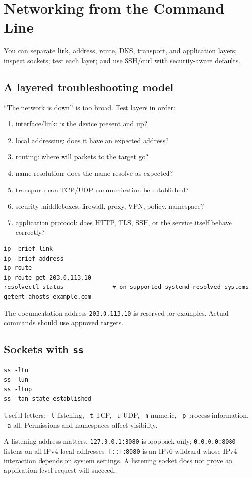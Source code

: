 \documentclass[11pt,oneside,openany]{book}
\newcommand{\chaptergoals}[1]{%
  \begin{tcolorbox}[colback=Paper,colframe=Blue,title={Learning outcomes},fonttitle=\bfseries]
  #1
  \end{tcolorbox}}
\begin{document}
\chapter{Networking from the Command Line}
\chaptergoals{You can separate link, address, route, DNS, transport, and application layers; inspect sockets; test each layer; and use SSH/curl with security-aware defaults.}

\section{A layered troubleshooting model}
“The network is down” is too broad. Test layers in order:
\begin{enumerate}
  \item interface/link: is the device present and up?
  \item local addressing: does it have an expected address?
  \item routing: where will packets to the target go?
  \item name resolution: does the name resolve as expected?
  \item transport: can TCP/UDP communication be established?
  \item security middleboxes: firewall, proxy, VPN, policy, namespace?
  \item application protocol: does HTTP, TLS, SSH, or the service itself behave correctly?
\end{enumerate}

\begin{lstlisting}
ip -brief link
ip -brief address
ip route
ip route get 203.0.113.10
resolvectl status              # on supported systemd-resolved systems
getent ahosts example.com
\end{lstlisting}
The documentation address \texttt{203.0.113.10} is reserved for examples. Actual commands should use approved targets.

\section{Sockets with \texttt{ss}}
\begin{lstlisting}
ss -ltn
ss -lun
ss -ltnp
ss -tan state established
\end{lstlisting}
Useful letters: \texttt{-l} listening, \texttt{-t} TCP, \texttt{-u} UDP, \texttt{-n} numeric, \texttt{-p} process information, \texttt{-a} all. Permissions and namespaces affect visibility.

A listening address matters. \texttt{127.0.0.1:8080} is loopback-only; \texttt{0.0.0.0:8080} listens on all IPv4 local addresses; \texttt{[::]:8080} is an IPv6 wildcard whose IPv4 interaction depends on system settings. A listening socket does not prove an application-level request will succeed.
\end{document}
